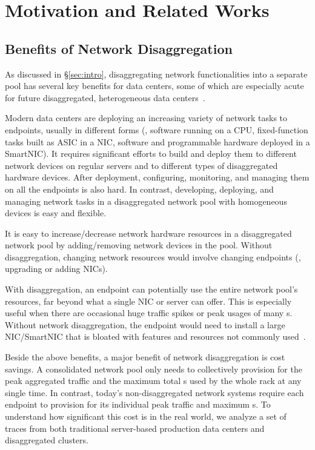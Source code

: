 \section{Motivation and Related Works}
\label{sec:motivation}

\subsection{Benefits of Network Disaggregation}
\label{sec:benefits}
As discussed in \S\ref{sec:intro}, disaggregating network functionalities into a separate pool has several key benefits for data centers, some of which are especially acute for future disaggregated, heterogeneous data centers~\cite{LegoOS,last-cpu-hotos, FratOS-eurosys}.

Modern data centers are deploying an increasing variety of network tasks to endpoints, usually in different forms (\eg, software running on a CPU, fixed-function tasks built as ASIC in a NIC, software and programmable hardware deployed in a SmartNIC). 
It requires significant efforts to build and deploy them to different network devices on regular servers and to different types of disaggregated hardware devices.
After deployment, configuring, monitoring, and managing them on all the endpoints is also hard.
In contrast, developing, deploying, and managing network tasks in a disaggregated network pool with homogeneous devices is easy and flexible.

It is easy to increase/decrease network hardware resources in a disaggregated network pool by adding/removing network devices in the pool. Without disaggregation, changing network resources would involve changing endpoints (\eg, upgrading or adding NICs).

With disaggregation, an endpoint can potentially use the entire network pool's resources, far beyond what a single NIC or server can offer.
This is especially useful when there are occasional huge traffic spikes or peak usages of many \nt{}s.
Without network disaggregation, the endpoint would need to install a large NIC/SmartNIC that is bloated with features and resources not commonly used~\cite{SmartNIC-nsdi18,Caulfield-2018}.

Beside the above benefits, a major benefit of network disaggregation is cost savings. A consolidated network pool only needs to collectively provision for the peak aggregated traffic and the maximum total \nt{}s used by the whole rack at any single time.
In contrast, today's non-disaggregated network systems require each endpoint to provision for its individual peak traffic and maximum \nt{}s.
To understand how significant this cost is in the real world, we analyze a set of traces from both traditional server-based production data centers and disaggregated clusters.

